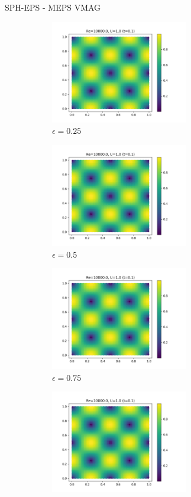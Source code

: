 SPH-EPS - MEPS VMAG 
\begin{figure}[H]
  \begin{subfigure}{7cm}
  \centering\includegraphics[width=6cm]{Code-Figures/mon2017/meps/c0_20_tait_pec_dtmul_1_meps_0.25_nx_50_pst_10_re_10000_mon2017/final_vmag.png}
  \caption{$\epsilon = 0.25$}
  \end{subfigure}
  \begin{subfigure}{7cm}
  \centering\includegraphics[width=6cm]{Code-Figures/mon2017/meps/c0_20_tait_pec_dtmul_1_meps_0.5_nx_50_pst_10_re_10000_mon2017/final_vmag.png}
  \caption{$\epsilon = 0.5$}
  \end{subfigure}
  \begin{subfigure}{7cm}
  \centering\includegraphics[width=6cm]{Code-Figures/mon2017/meps/c0_20_tait_pec_dtmul_1_meps_0.75_nx_50_pst_10_re_10000_mon2017/final_vmag.png}
  \caption{$\epsilon = 0.75$}
  \end{subfigure}
  \begin{subfigure}{7cm}
  \centering\includegraphics[width=6cm]{Code-Figures/mon2017/meps/c0_20_tait_pec_dtmul_1_meps_1.0_nx_50_pst_10_re_10000_mon2017/final_vmag.png}

\end{subfigure}
\end{figure}
